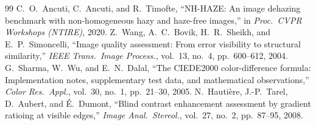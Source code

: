 \documentclass[conference]{IEEEtran}
\begin{document}
\begin{thebibliography}{99}
 C.~O.~Ancuti, C.~Ancuti, and R.~Timofte, ``NH-HAZE: An image dehazing benchmark with non-homogeneous hazy and haze-free images,'' in \emph{Proc.\ CVPR Workshops (NTIRE)}, 2020.
 Z.~Wang, A.~C.~Bovik, H.~R.~Sheikh, and E.~P.~Simoncelli, ``Image quality assessment: From error visibility to structural similarity,'' \emph{IEEE Trans.\ Image Process.}, vol.~13, no.~4, pp.~600--612, 2004.
 G.~Sharma, W.~Wu, and E.~N.~Dalal, ``The CIEDE2000 color-difference formula: Implementation notes, supplementary test data, and mathematical observations,'' \emph{Color Res.\ Appl.}, vol.~30, no.~1, pp.~21--30, 2005.
 N.~Hauti\`ere, J.-P.~Tarel, D.~Aubert, and \'E.~Dumont, ``Blind contrast enhancement assessment by gradient ratioing at visible edges,'' \emph{Image Anal.\ Stereol.}, vol.~27, no.~2, pp.~87--95, 2008.
\end{thebibliography}
\end{document}
